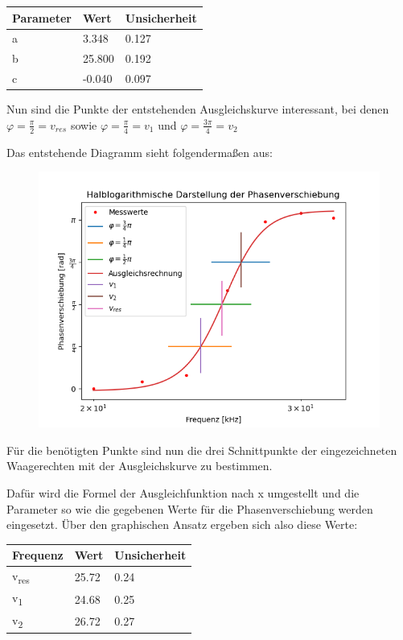\documentclass[titlepage=firstcover, captions=tableheading]{scrartcl}
\begin{document}
\begin{center}
    \begin{tabular}{ll@{${}\pm{}$}l}
        \toprule
        Parameter & Wert & Unsicherheit\\
        \midrule
        a &    3.348 & 0.127 \\
        b &   25.800 & 0.192 \\
        c &   -0.040 & 0.097 \\
        \bottomrule
        
    \end{tabular}
\end{center}

\noindent Nun sind die Punkte der entstehenden Ausgleichskurve interessant, bei denen $\varphi = \frac{\pi}{2} = v_{res}$ sowie $\varphi = \frac{\pi}{4} = v_{1}$
und $\varphi = \frac{3\pi}{4} = v_{2}$

\noindent Das entstehende Diagramm sieht folgendermaßen aus:

\begin{figure}[H]
    \includegraphics{5d.png}
\end{figure}

\noindent Für die benötigten Punkte sind nun die drei Schnittpunkte der eingezeichneten Waagerechten mit der Ausgleichskurve zu bestimmen.

\noindent Dafür wird die Formel der Ausgleichfunktion nach x umgestellt und die Parameter so wie die gegebenen Werte für die Phasenverschiebung werden eingesetzt.
Über den graphischen Ansatz ergeben sich also diese Werte:
\begin{center}
    \begin{tabular}{ll@{${}\pm{}$}l}
        \toprule
        Frequenz & Wert & Unsicherheit\\
        \midrule
        v\textsubscript{res} & 25.72 & 0.24     \\
        v\textsubscript{1} &  24.68 & 0.25      \\
        v\textsubscript{2} &  26.72 & 0.27      \\
        \bottomrule
        
    \end{tabular}
\end{center}
\end{document}
